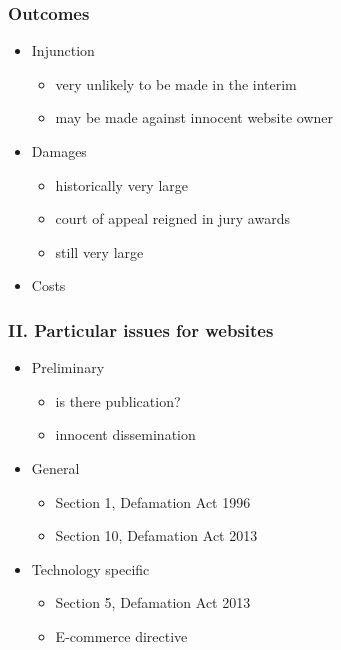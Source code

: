 \documentclass[ignorenonframetext,]{beamer}
\begin{document}
\begin{frame}
\frametitle{Outcomes}

\begin{itemize}
\item  Injunction
  \begin{itemize}
  \item very unlikely to be  made in the interim
  \item may be made against innocent website owner
  \end{itemize}
\item  Damages

  \begin{itemize}
  \item historically very large
  \item court of appeal reigned in jury awards
  \item still very large
  \end{itemize}
\item  Costs
\end{itemize}
\end{frame}


\begin{frame}
\frametitle{II. Particular issues for websites}
\begin{itemize}
\item Preliminary
  \begin{itemize}
  \item is there publication?
  \item innocent dissemination
  \end{itemize}
\item General
  \begin{itemize}
  \item Section 1, Defamation Act 1996
  \item Section 10, Defamation Act 2013
  \end{itemize}
\item Technology specific
  \begin{itemize}
  \item Section 5, Defamation Act 2013
  \item E-commerce directive
  \end{itemize}
\end{itemize}
\end{frame}
\end{document}
